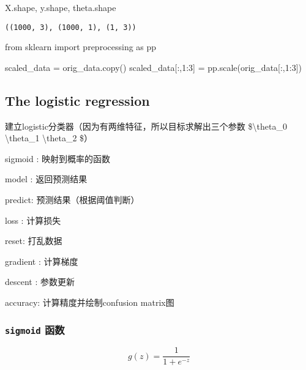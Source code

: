 \documentclass[
]{article}
\newenvironment{Shaded}{}{}
\newcommand{\DecValTok}[1]{\textcolor[rgb]{0.25,0.63,0.44}{#1}}
\newcommand{\ImportTok}[1]{#1}
\newcommand{\NormalTok}[1]{#1}
\newcommand{\OperatorTok}[1]{\textcolor[rgb]{0.40,0.40,0.40}{#1}}
\begin{document}
\begin{Shaded}
\begin{Highlighting}[]
\NormalTok{X.shape, y.shape, theta.shape}
\end{Highlighting}
\end{Shaded}

\begin{verbatim}
((1000, 3), (1000, 1), (1, 3))
\end{verbatim}

\begin{Shaded}
\begin{Highlighting}[]
\ImportTok{from}\NormalTok{ sklearn }\ImportTok{import}\NormalTok{ preprocessing }\ImportTok{as}\NormalTok{ pp}

\NormalTok{scaled\_data }\OperatorTok{=}\NormalTok{ orig\_data.copy()}
\NormalTok{scaled\_data[:,}\DecValTok{1}\NormalTok{:}\DecValTok{3}\NormalTok{] }\OperatorTok{=}\NormalTok{ pp.scale(orig\_data[:,}\DecValTok{1}\NormalTok{:}\DecValTok{3}\NormalTok{])}
\end{Highlighting}
\end{Shaded}

\hypertarget{the-logistic-regression}{%
\subsection{The logistic regression}\label{the-logistic-regression}}

建立logistic分类器（因为有两维特征，所以目标求解出三个参数
\$\textbackslash theta\_0 \textbackslash theta\_1
\textbackslash theta\_2 \$）

sigmoid : 映射到概率的函数

model : 返回预测结果

predict: 预测结果（根据阈值判断）

loss : 计算损失

reset: 打乱数据

gradient : 计算梯度

descent : 参数更新

accuracy: 计算精度并绘制confusion matrix图

\hypertarget{sigmoid-ux51fdux6570}{%
\subsubsection{\texorpdfstring{\texttt{sigmoid}
函数}{sigmoid 函数}}\label{sigmoid-ux51fdux6570}}

\[
g(z) = \frac{1}{1+e^{-z}}   
\]
\end{document}
